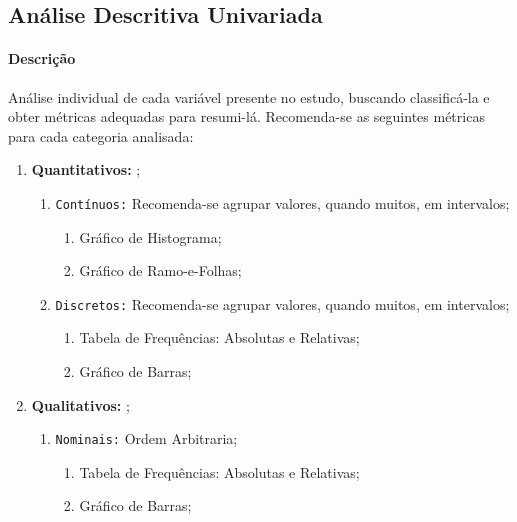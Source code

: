 \documentclass{article}
\begin{document}
        \subsection{Análise Descritiva Univariada}
            \paragraph{Descrição}Análise individual de cada variável presente no estudo, buscando classificá-la e obter métricas adequadas para resumi-lá. Recomenda-se as seguintes métricas para cada categoria analisada:
                \begin{enumerate}[noitemsep]
                    \item \textbf{Quantitativos:} ;
                        \begin{enumerate}[noitemsep]
                            \item \texttt{Contínuos:} Recomenda-se agrupar valores, quando muitos, em intervalos;
                                \begin{enumerate}[noitemsep]
                                    \item Gráfico de Histograma;
                                    \item Gráfico de Ramo-e-Folhas;
                                \end{enumerate}
                            \item \texttt{Discretos:} Recomenda-se agrupar valores, quando muitos, em intervalos;
                                \begin{enumerate}[noitemsep]
                                    \item Tabela de Frequências: Absolutas e Relativas;
                                    \item Gráfico de Barras;
                                \end{enumerate}
                        \end{enumerate}
                    \item \textbf{Qualitativos:} ;
                        \begin{enumerate}[noitemsep]
                            \item \texttt{Nominais:} Ordem Arbitraria; 
                                \begin{enumerate}[noitemsep]
                                    \item Tabela de Frequências: Absolutas e Relativas;
                                    \item Gráfico de Barras;

\end{enumerate}
\end{enumerate}
\end{enumerate}
\end{document}

